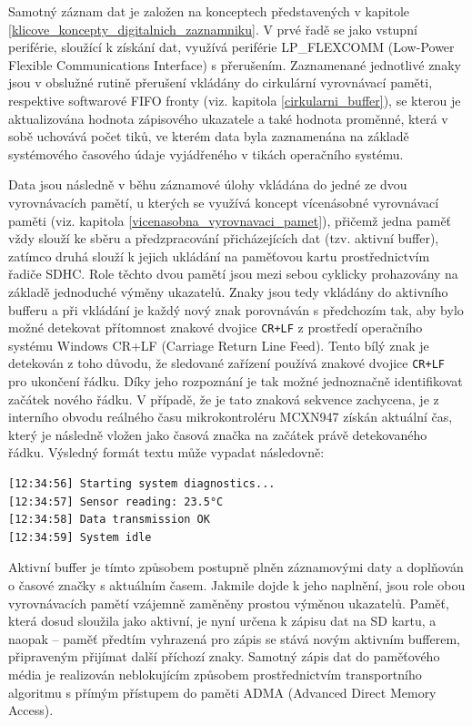 Samotný záznam dat je založen na konceptech představených v kapitole \ref{klicove_koncepty_digitalnich_zaznamniku}. V prvé řadě se jako vstupní periférie, sloužící k získání dat, využívá periférie LP\_FLEXCOMM (Low-Power Flexible Communications Interface) s přerušením. Zaznamenané jednotlivé znaky jsou v obslužné rutině přerušení vkládány do cirkulární vyrovnávací paměti, respektive softwarové FIFO fronty (viz. kapitola \ref{cirkularni_buffer}), se kterou je aktualizována hodnota zápisového ukazatele a také hodnota proměnné, která v sobě uchovává počet tiků, ve kterém data byla zaznamenána na základě systémového časového údaje vyjádřeného v tikách operačního systému.

Data jsou následně v běhu záznamové úlohy vkládána do jedné ze dvou vyrovnávacích pamětí, u kterých se využívá koncept vícenásobné vyrovnávací paměti (viz. kapitola \ref{vicenasobna_vyrovnavaci_pamet}), přičemž jedna paměť vždy slouží ke sběru a předzpracování přicházejících dat (tzv. aktivní buffer), zatímco druhá slouží k jejich ukládání na paměťovou kartu prostřednictvím řadiče SDHC. Role těchto dvou pamětí jsou mezi sebou cyklicky prohazovány na základě jednoduché výměny ukazatelů. Znaky jsou tedy vkládány do aktivního bufferu a při vkládání je každý nový znak porovnáván s předchozím tak, aby bylo možné detekovat přítomnost znakové dvojice \texttt{CR+LF} z prostředí operačního systému Windows CR+LF (Carriage Return Line Feed). Tento bílý znak je detekován z toho důvodu, že sledované zařízení používá znakové dvojice \texttt{CR+LF} pro ukončení řádku. Díky jeho rozpoznání je tak možné jednoznačně identifikovat začátek nového řádku. V případě, že je tato znaková sekvence zachycena, je z interního obvodu reálného času mikrokontroléru MCXN947 získán aktuální čas, který je následně vložen jako časová značka na začátek právě detekovaného řádku. Výsledný formát textu může vypadat následovně:

\begin{verbatim}
[12:34:56] Starting system diagnostics...
[12:34:57] Sensor reading: 23.5°C
[12:34:58] Data transmission OK
[12:34:59] System idle
\end{verbatim}

Aktivní buffer je tímto způsobem postupně plněn záznamovými daty a doplňován o časové značky s aktuálním časem. Jakmile dojde k jeho naplnění, jsou role obou vyrovnávacích pamětí vzájemně zaměněny prostou výměnou ukazatelů. Paměť, která dosud sloužila jako aktivní, je nyní určena k zápisu dat na SD kartu, a naopak – paměť předtím vyhrazená pro zápis se stává novým aktivním bufferem, připraveným přijímat další příchozí znaky. Samotný zápis dat do paměťového média je realizován neblokujícím způsobem prostřednictvím transportního algoritmu s přímým přístupem do paměti ADMA (Advanced Direct Memory Access). \cite{nxp_MCX_Nx4x_Reference_Manual}

